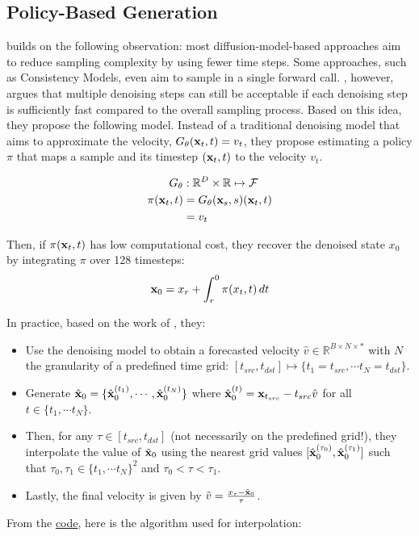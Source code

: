 \subsection{Policy-Based Generation}
\cite{chen2026piflowpolicybasedfewstepgeneration} builds on the following observation: most diffusion-model-based approaches aim to reduce sampling complexity by using fewer time steps. Some approaches, such as Consistency Models, even aim to sample in a single forward call. \cite{chen2026piflowpolicybasedfewstepgeneration}, however, argues that multiple denoising steps can still be acceptable if each denoising step is sufficiently fast compared to the overall sampling process. Based on this idea, they propose the following model. Instead of a traditional denoising model that aims to approximate the velocity, $G_{\theta}(\mathbf{x}_t, t) = v_t$, they propose estimating a policy $\pi$ that maps a sample and its timestep $(\mathbf{x}_t, t)$ to the velocity $v_t$.

\begin{align*}
    G_{\theta} & : \mathbb{R}^D \times \mathbb{R} \mapsto \mathcal{F} \\
    \pi(\mathbf{x}_t, t) & = G_{\theta}(\mathbf{x}_s, s)(\mathbf{x}_t, t) \\
                & = v_t
\end{align*}

\noindent Then, if $\pi(\mathbf{x}_t, t)$ has low computational cost, they recover the denoised state $x_0$ by integrating $\pi$ over 128 timesteps:
\begin{align*}
    \mathbf{x}_0 = x_r + \int^0_r \pi(x_t, t)\, dt
\end{align*}

\noindent In practice, based on the work of \cite{chen2025gaussianmixtureflowmatching}, they:
\begin{itemize}
    \item Use the denoising model to obtain a forecasted velocity $\hat{v} \in \mathbb{R}^{B \times N \times *}$ with $N$ the granularity of a predefined time grid: $[t_{src}, t_{dst}] \mapsto \{t_1 = t_{src}, \cdots t_N = t_{dst}\}$.
    \item Generate $\hat{\mathbf{x}}_0 = \{\hat{\mathbf{x}}^{(t_1)}_0, \cdots, \hat{\mathbf{x}}^{(t_N)}_0\}$ where $\hat{\mathbf{x}}^{(t)}_0 = \mathbf{x}_{t_{src}} - t_{src} \hat{v}$ for all $t \in \{t_1, \cdots t_N\}$.
    \item Then, for any $\tau \in [t_{src}, t_{dst}]$ (not necessarily on the predefined grid!), they interpolate the value of $\tilde{\mathbf{x}}_0$ using the nearest grid values $[\hat{\mathbf{x}}^{(\tau_0)}_0, \hat{\mathbf{x}}^{(\tau_1)}_0]$ such that $\tau_0, \tau_1 \in \{t_1, \cdots t_N\}^2$ and $\tau_0 < \tau < \tau_1$.
    \item Lastly, the final velocity is given by $\tilde{v} = \frac{x_{\tau} - \tilde{\mathbf{x}}_0}{\tau}$.
\end{itemize}
\noindent From the \href{https://github.com/Lakonik/piFlow/blob/422954182a10f27eb05458bb5a43f1518817cf70/lakonlab/models/diffusions/piflow_policies/dx.py#L4}{code}, here is the algorithm used for interpolation:

